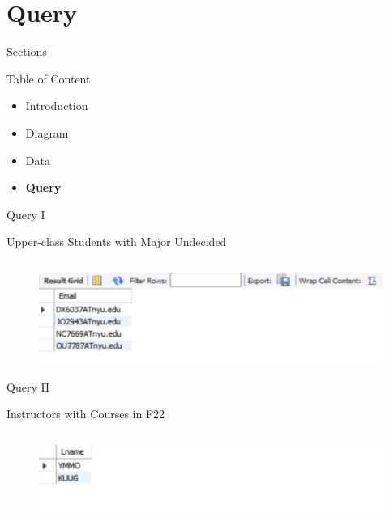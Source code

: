 \documentclass[a4paper,10pt]{beamer}
\begin{document}
\section{Query}
\begin{frame}{Sections}
\begin{block}{Table of Content}
\begin{itemize}
    \item Introduction
    \item Diagram
    \item Data
    \item \textbf{Query}
\end{itemize}
\end{block}
\end{frame}

\begin{frame}{Query I}
\begin{block}{Upper-class Students with Major Undecided}
    \inputminted[linenos]{mysql}{1.txt}
\end{block}
\begin{figure}[H]
    \includegraphics[width=\textwidth]{1.png}
\end{figure}
\end{frame}

\begin{frame}{Query II}
\begin{block}{Instructors with Courses in F22}
    \inputminted[linenos]{mysql}{2.txt}
\end{block}
\begin{figure}[H]
    \includegraphics[width=\textwidth]{2.png}
\end{figure}
\end{frame}
\end{document}
